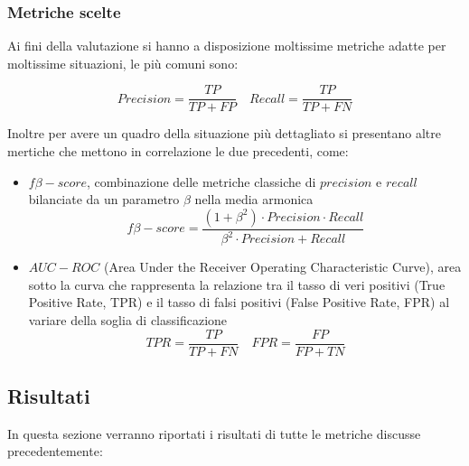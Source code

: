 \documentclass[italian,12pt,a4paper]{article}
\begin{document}
	
	\subsubsection{Metriche scelte}
	Ai fini della valutazione si hanno a disposizione moltissime metriche adatte per moltissime situazioni, le più comuni sono:
	
	$$Precision = \frac{TP}{TP+FP} \quad Recall = \frac{TP}{TP+FN}$$

	Inoltre per avere un quadro della situazione più dettagliato si presentano altre mertiche che mettono in correlazione le due precedenti, come:
	
		
	\begin{itemize}
		\item $f\beta-score$,  combinazione delle metriche classiche di $precision$ e $recall$ bilanciate da un parametro $\beta$ nella media armonica
		$$f\beta-score = \frac{(1+ \beta^2) \cdot Precision \cdot Recall}{\beta^2 \cdot Precision + Recall}$$
		\item $AUC-ROC$ (Area Under the Receiver Operating Characteristic Curve), area sotto la curva che rappresenta la relazione tra il tasso di veri positivi (True Positive Rate, TPR) e il tasso di falsi positivi (False Positive Rate, FPR) al variare della soglia di classificazione
		$$TPR = \frac{TP}{TP+FN} \quad FPR = \frac{FP}{FP+TN}$$
	
	\end{itemize} 

	\subsection{Risultati}
		In questa sezione verranno riportati i risultati di tutte le metriche discusse precedentemente:
	
\end{document}
